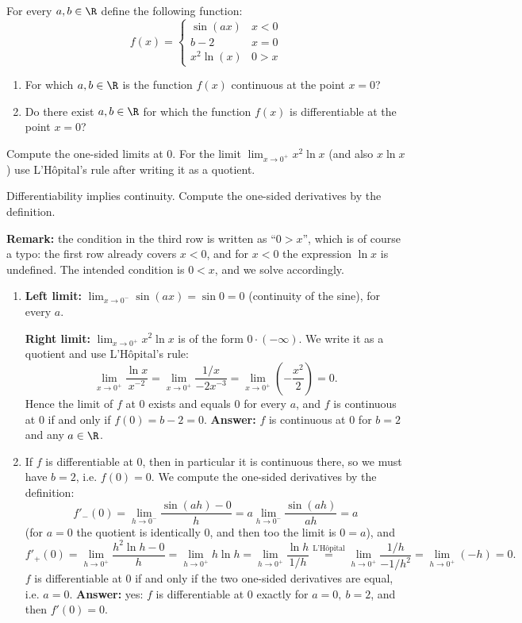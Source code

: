 
\begin{question}
For every $a,b\in\R$ define the following function:
\[ f(x)=\begin{cases} \sin(ax) & x<0\\ b-2 & x=0\\ x^2\ln(x) & 0>x\end{cases} \]
\begin{enumerate}
  \item For which $a,b\in\R$ is the function $f(x)$ continuous at the point $x=0$?
  \item Do there exist $a,b\in\R$ for which the function $f(x)$ is differentiable at the point $x=0$?
\end{enumerate}
\end{question}

\begin{hint}
Compute the one-sided limits at $0$. For the limit $\lim_{x\to0^+}x^2\ln x$ (and also $x\ln x$) use L'Hôpital's rule after writing it as a quotient.
\end{hint}

\begin{hint}
Differentiability implies continuity. Compute the one-sided derivatives by the definition.
\end{hint}

\begin{solution}
\textbf{Remark:} the condition in the third row is written as ``$0>x$'', which is of course a typo: the first row already covers $x<0$, and for $x<0$ the expression $\ln x$ is undefined. The intended condition is $0<x$, and we solve accordingly.
\begin{enumerate}
  \item \textbf{Left limit:} $\lim_{x\to0^-}\sin(ax)=\sin0=0$ (continuity of the sine), for every $a$.

  \textbf{Right limit:} $\lim_{x\to0^+}x^2\ln x$ is of the form $0\cdot(-\infty)$. We write it as a quotient and use L'Hôpital's rule:
  \[ \lim_{x\to0^+}\frac{\ln x}{x^{-2}}=\lim_{x\to0^+}\frac{1/x}{-2x^{-3}}=\lim_{x\to0^+}\left(-\frac{x^2}{2}\right)=0. \]
  Hence the limit of $f$ at $0$ exists and equals $0$ for every $a$, and $f$ is continuous at $0$ if and only if $f(0)=b-2=0$.
  \textbf{Answer:} $f$ is continuous at $0$ for $b=2$ and any $a\in\R$.
  \item If $f$ is differentiable at $0$, then in particular it is continuous there, so we must have $b=2$, i.e. $f(0)=0$. We compute the one-sided derivatives by the definition:
  \[ f'_-(0)=\lim_{h\to0^-}\frac{\sin(ah)-0}{h}=a\lim_{h\to0^-}\frac{\sin(ah)}{ah}=a \]
  (for $a=0$ the quotient is identically $0$, and then too the limit is $0=a$), and
  \[ f'_+(0)=\lim_{h\to0^+}\frac{h^2\ln h-0}{h}=\lim_{h\to0^+}h\ln h=\lim_{h\to0^+}\frac{\ln h}{1/h}\overset{\text{L'Hôpital}}{=}\lim_{h\to0^+}\frac{1/h}{-1/h^2}=\lim_{h\to0^+}(-h)=0. \]
  $f$ is differentiable at $0$ if and only if the two one-sided derivatives are equal, i.e. $a=0$.
  \textbf{Answer:} yes: $f$ is differentiable at $0$ exactly for $a=0,\ b=2$, and then $f'(0)=0$.
\end{enumerate}
\end{solution}
